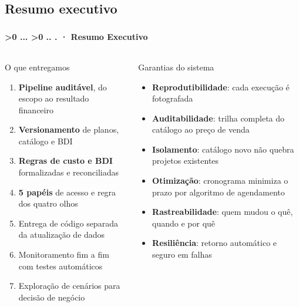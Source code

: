 \documentclass[aspectratio=169,10pt]{beamer}
\newcounter{mlc3}[subsection]
\newcounter{mlc4}[mlc3]
\newcommand{\pathnum}{%
  \ifnum\value{mlc4}>0
    \thesection.\thesubsection.\arabic{mlc3}.\arabic{mlc4}%
  \else\ifnum\value{mlc3}>0
    \thesection.\thesubsection.\arabic{mlc3}%
  \else
    \thesection.\thesubsection%
  \fi\fi
}
\newcommand{\mtitle}[1]{%
  \frametitle{\insertsection}%
  \framesubtitle{\pathnum\;·\; #1}}
\begin{document}
\subsection{Resumo executivo}
\begin{frame}
  \mtitle{Resumo Executivo}
  \begin{columns}[T]
    \begin{block}{O que entregamos}
      \begin{enumerate}\small
        \item \textbf{Pipeline auditável}, do escopo ao resultado financeiro
        \item \textbf{Versionamento} de planos, catálogo e BDI
        \item \textbf{Regras de custo e BDI} formalizadas e reconciliadas
        \item \textbf{5 papéis} de acesso e regra dos quatro olhos
        \item Entrega de código separada da atualização de dados
        \item Monitoramento fim a fim com testes automáticos
        \item Exploração de cenários para decisão de negócio
      \end{enumerate}
    \end{block}
    \begin{block}{Garantias do sistema}
      \begin{itemize}\small
        \item \textbf{Reprodutibilidade}: cada execução é fotografada
        \item \textbf{Auditabilidade}: trilha completa do catálogo ao preço de venda
        \item \textbf{Isolamento}: catálogo novo não quebra projetos existentes
        \item \textbf{Otimização}: cronograma minimiza o prazo por algoritmo de agendamento
        \item \textbf{Rastreabilidade}: quem mudou o quê, quando e por quê
        \item \textbf{Resiliência}: retorno automático e seguro em falhas
      \end{itemize}
    \end{block}
  \end{columns}
\end{frame}
\end{document}
